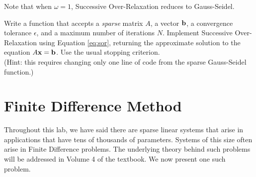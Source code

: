 Note that when $\omega = 1$, Successive Over-Relaxation reduces to Gauss-Seidel.

\begin{problem}
Write a function that accepts a \emph{sparse} matrix $A$, a vector $\mathbf{b}$, a convergence tolerance $\epsilon$, and a maximum number of iterations $N$.
Implement Successive Over-Relaxation using Equation \ref{eq:sor}, returning the approximate solution to the equation $A\mathbf{x} = \mathbf{b}$.
Use the usual stopping criterion.
\\(Hint: this requires changing only one line of code from the sparse Gauss-Seidel function.)
\end{problem}

\section*{Finite Difference Method} %

Throughout this lab, we have said there are sparse linear systems that arise in applications that have tens of thousands of parameters. Systems of this size
often arise in Finite Difference problems. The underlying theory behind such problems will be addressed in Volume 4 of the textbook. We now present one such problem.

